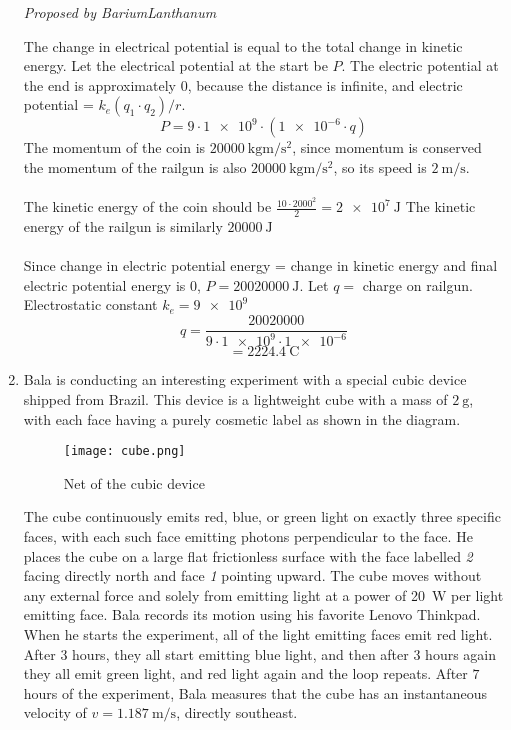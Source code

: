 \begin{enumerate}[align=left,start=1,label=\textbf{\textcolor{meared}{Problem \arabic*}}]
        \textrm{\emph{Proposed by BariumLanthanum}}
        \begin{solution}
            The change in electrical potential is equal to the total change in kinetic energy.
            Let the electrical potential at the start be $P$. The electric potential at the end is approximately 0, because the distance is infinite, and electric potential = $k_e (q_1 \cdot q_2) / r$.
            \[P = 9 \cdot \num{1e9} \cdot (\num{1e-6} \cdot q)\]
            The momentum of the coin is $\qty{20000}{\kilogram \meter \per \second \squared}$, since momentum is conserved the momentum of the railgun is also $\qty{20000}{\kilogram \meter \per \second \squared}$, so its speed is $\qty{2}{\meter \per \second}$.
            \\ \\
            The kinetic energy of the coin should be $\frac{10 \cdot 2000^2}{2}  = \qty{2e7}{\joule}$
            The kinetic energy of the railgun is similarly $\qty{20000}{\joule}$
            \\ \\
            Since change in electric potential energy = change in kinetic energy and final electric potential energy is $0$, $P = \qty{20020000}{\joule}$.
            Let $q =$ charge on railgun.
            Electrostatic constant $k_e = \num{9e9}$
            \[q = \frac{20020000}{9 \cdot \num{1e9} \cdot \num{1e-6}}\]
            \[= \qty{2224.4}{\coulomb}\]
        \end{solution}
    \item
        Bala is conducting an interesting experiment with a special cubic device shipped from Brazil. This device is a lightweight cube with a mass of $\qty{2}{\gram}$, with each face having a purely cosmetic label as shown in the diagram.
        \begin{figure}[!ht]
            \centering
            \texttt{[image: cube.png]}
            \caption{Net of the cubic device}
        \end{figure}
        The cube continuously emits red, blue, or green light on exactly three specific faces, with each such face emitting photons perpendicular to the face. He places the cube on a large flat frictionless surface with the face labelled \emph{2} facing directly north and face \emph{1} pointing upward. The cube moves without any external force and solely from emitting light at a power of \qty{20}{\watt} per light emitting face. Bala records its motion using his favorite Lenovo Thinkpad. When he starts the experiment, all of the light emitting faces emit red light. After $3$ hours, they all start emitting blue light, and then after $3$ hours again they all emit green light, and red light again and the loop repeats. After $7$ hours of the experiment, Bala measures that the cube has an instantaneous velocity of $v = \qty[per-mode = symbol]{1.187}{\meter\per\second}$, directly southeast. 

\end{enumerate}
